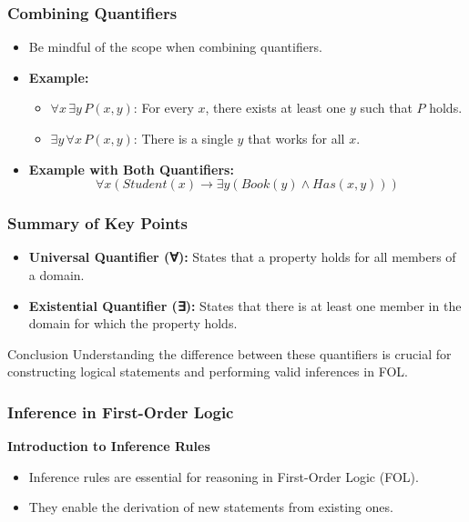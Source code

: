 \documentclass[aspectratio=169]{beamer}
\begin{document}
\begin{frame}[fragile]
    \frametitle{Combining Quantifiers}
    \begin{itemize}
        \item Be mindful of the scope when combining quantifiers.
        
        \item \textbf{Example:} 
        \begin{itemize}
            \item $\forall x \, \exists y \, P(x, y)$: For every \( x \), there exists at least one \( y \) such that \( P \) holds.
            \item $\exists y \, \forall x \, P(x, y)$: There is a single \( y \) that works for all \( x \).
        \end{itemize}

        \item \textbf{Example with Both Quantifiers:}
        \begin{equation}
            \forall x (Student(x) \rightarrow \exists y (Book(y) \land Has(x, y)))
        \end{equation}
    \end{itemize}
\end{frame}

\begin{frame}[fragile]
    \frametitle{Summary of Key Points}
    \begin{itemize}
        \item \textbf{Universal Quantifier (∀):} States that a property holds for all members of a domain.
        \item \textbf{Existential Quantifier (∃):} States that there is at least one member in the domain for which the property holds.
    \end{itemize}
    \begin{block}{Conclusion}
        Understanding the difference between these quantifiers is crucial for constructing logical statements and performing valid inferences in FOL.
    \end{block}
\end{frame}

\begin{frame}[fragile]
    \frametitle{Inference in First-Order Logic}
    \textbf{Introduction to Inference Rules}
    \begin{itemize}
        \item Inference rules are essential for reasoning in First-Order Logic (FOL).
        \item They enable the derivation of new statements from existing ones.
    \end{itemize}
\end{frame}
\end{document}
